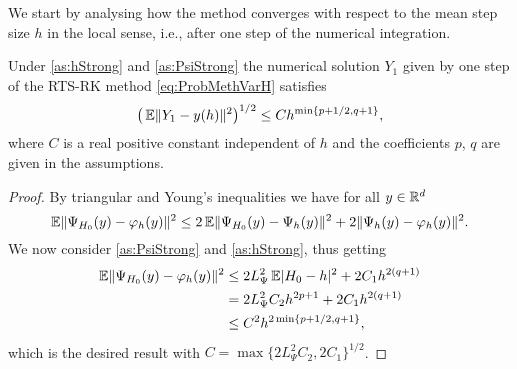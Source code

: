 \documentclass[10pt]{article}
\begin{document}
We start by analysing how the method converges with respect to the mean step size $h$ in the local sense, i.e., after one step of the numerical integration.
\begin{lemma}\label{thm:StrongOrderLocal} Under \cref{as:hStrong} and \cref{as:PsiStrong} the numerical solution $Y_1$ given by one step of the RTS-RK method \eqref{eq:ProbMethVarH} satisfies 
	\begin{equation}
		\big(\operatorname{\mathbb{E}}\lVert Y_1 - y(h)\rVert^2\big)^{1/2} \leq C h^{\min\{p+1/2, q + 1\}},
	\end{equation}
	where $C$ is a real positive constant independent of $h$ and the coefficients $p$, $q$ are given in the assumptions.
\end{lemma}
\begin{proof} By triangular and Young's inequalities we have for all $y \in \mathbb{R}^d$ 
	\begin{equation}
		\operatorname{\mathbb{E}}\lVert\Psi_{H_0}(y) - \varphi_h(y)\rVert^2 \leq 2\operatorname{\mathbb{E}}\lVert\Psi_{H_0}(y) - \Psi_h(y)\rVert^2 + 2\lVert\Psi_h(y) - \varphi_h(y)\rVert^2.
	\end{equation}		
	We now consider \cref{as:PsiStrong} and \cref{as:hStrong}, thus getting
	\begin{equation}\label{eq:LocalErrorDecomposition}
	\begin{aligned}
		\operatorname{\mathbb{E}}\lVert\Psi_{H_0}(y) - \varphi_h(y)\rVert^2 &\leq 2L_{\Psi}^2 \operatorname{\mathbb{E}}\lvert H_0 - h\rvert^2 + 2C_1 h^{2(q+1)} \\
		&= 2L_{\Psi}^2 C_2 h^{2p+1} + 2 C_1 h^{2(q+1)} \\
		&\leq C^2 h^{2\min\{p+1/2,q+1\}},
	\end{aligned}
	\end{equation}
	which is the desired result with $C = \max\{2L_{\Psi}^2 C_2, 2 C_1\}^{1/2}$.
\end{proof}
\end{document}
